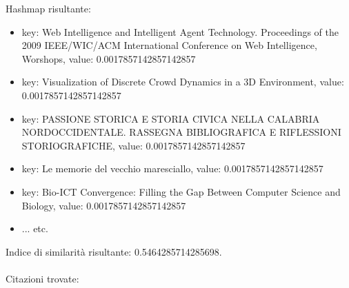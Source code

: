 \documentclass[12pt]{article}
\begin{document}
Hashmap risultante:
\begin{itemize}
\item key: Web Intelligence and Intelligent Agent Technology. Proceedings of the 2009 IEEE/WIC/ACM International Conference on Web Intelligence, Worshops, value: 0.0017857142857142857
\item key: Visualization of Discrete Crowd Dynamics in a 3D Environment, value: 0.0017857142857142857
\item key: PASSIONE STORICA E STORIA CIVICA NELLA CALABRIA NORDOCCIDENTALE. RASSEGNA BIBLIOGRAFICA E RIFLESSIONI STORIOGRAFICHE, value: 0.0017857142857142857
\item key: Le memorie del vecchio maresciallo, value: 0.0017857142857142857
\item key: Bio-ICT Convergence: Filling the Gap Between Computer Science and Biology, value: 0.0017857142857142857
\item ... etc.
\end{itemize}
Indice di similarit\`a risultante: 0.5464285714285698. \\
\\
Citazioni trovate:
\end{document}
